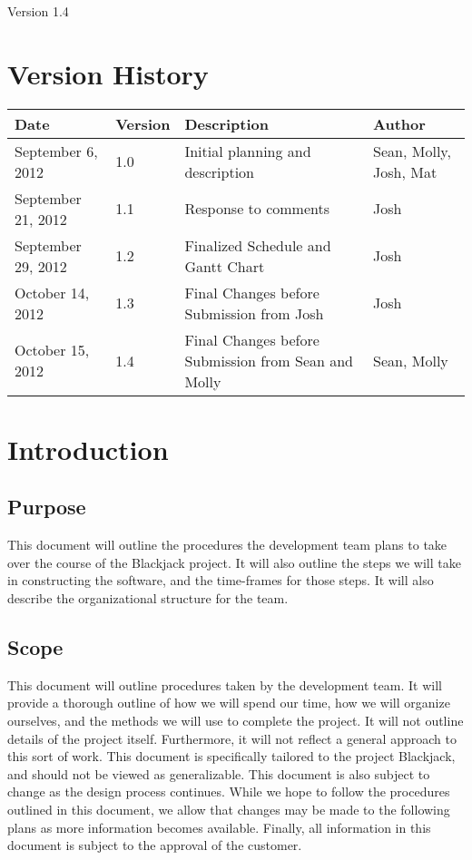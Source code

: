 \documentclass{article}
\title{\Title}
\author{\Author}
\date{\today}
\def\SDPVersion{1.4}
\def\Version{\SDPVersion}
\newcommand{\setupintro}{
\renewcommand{\thepage}{}
\maketitle
\begin{center}
\large Version \Version \normalsize
\end{center}
\newpage
\setcounter{page}{1}
\renewcommand{\thepage}{\roman{page}}
\tableofcontents 
\newpage
\setcounter{page}{1}
\renewcommand{\thepage}{\arabic{page}}
}
\begin{document}
\setupintro

\section{Version History}
\begin{tabular}{|l|l|l|l|}
\hline
Date & Version & Description & Author \\\hline
September 6, 2012 & 1.0 & Initial planning and description & Sean, Molly, Josh, Mat\\\hline
September 21, 2012 & 1.1 & Response to comments & Josh\\\hline
September 29, 2012 & 1.2 & Finalized Schedule and Gantt Chart& Josh\\\hline
October 14, 2012 & 1.3 & Final Changes before Submission from Josh& Josh\\\hline
October 15, 2012 & 1.4 & Final Changes before Submission from Sean and Molly& Sean, Molly\\\hline
\end{tabular}
\section{Introduction}
\subsection{Purpose}
This document will outline the procedures the development team plans to take over the course of the Blackjack project.  It will also outline the steps we will take in constructing the software, and the time-frames for those steps.  It will also describe the organizational structure for the team.
\subsection{Scope}
This document will outline procedures taken by the development team.  It will provide a thorough outline of how we will spend our time, how we will organize ourselves, and the methods we will use to complete the project.  It will not outline details of the project itself.  Furthermore, it will not reflect a general approach to this sort of work.  This document is specifically tailored to the project Blackjack, and should not be viewed as generalizable.  This document is also subject to change as the design process continues.  While we hope to follow the procedures outlined in this document, we allow that changes may be made to the following plans as more information becomes available.  Finally, all information in this document is subject to the approval of the customer.
\end{document}
